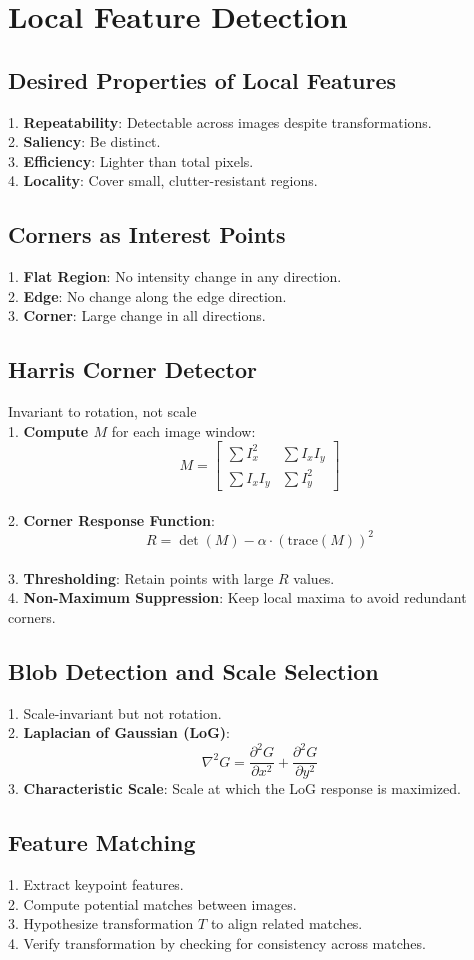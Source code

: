 \section{Local Feature Detection}

\subsection*{Desired Properties of Local Features}
1. \textbf{Repeatability}: Detectable across images despite transformations.\\
2. \textbf{Saliency}: Be distinct. \\
3. \textbf{Efficiency}: Lighter than total pixels. \\
4. \textbf{Locality}: Cover small, clutter-resistant regions.


\subsection*{Corners as Interest Points}
1. \textbf{Flat Region}: No intensity change in any direction. \\
2. \textbf{Edge}: No change along the edge direction. \\
3. \textbf{Corner}: Large change in all directions.
\subsection*{Harris Corner Detector}
Invariant to rotation, not scale\\
1. \textbf{Compute $M$} for each image window:
    \[
    M = 
    \begin{bmatrix}
    \sum I_x^2 & \sum I_x I_y \\
    \sum I_x I_y & \sum I_y^2
    \end{bmatrix}
    \] \\
2. \textbf{Corner Response Function}:
    \[
    R = \det(M) - \alpha \cdot (\text{trace}(M))^2
    \] \\
3. \textbf{Thresholding}: Retain points with large $R$ values. \\
4. \textbf{Non-Maximum Suppression}: Keep local maxima to avoid redundant corners.

\subsection*{Blob Detection and Scale Selection}
1. Scale-invariant but not rotation.\\
2. \textbf{Laplacian of Gaussian (LoG)}:
    \[
    \nabla^2 G = \frac{\partial^2 G}{\partial x^2} + \frac{\partial^2 G}{\partial y^2}
    \]
3. \textbf{Characteristic Scale}: Scale at which the LoG response is maximized.

\subsection*{Feature Matching}
1. Extract keypoint features.\\
2. Compute potential matches between images.\\
3. Hypothesize transformation $T$ to align related matches.\\
4. Verify transformation by checking for consistency across matches.

